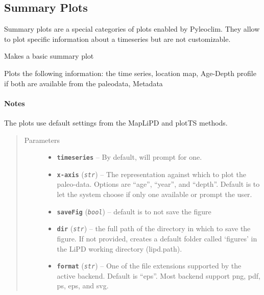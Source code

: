 \documentclass[letterpaper,10pt,english]{sphinxmanual}
\begin{document}
\subsection{Summary Plots}
\label{Main:summary-plots}
Summary plots are a special categories of plots enabled by Pyleoclim.
They allow to plot specific information about a timeseries but are not customizable.

\begin{fulllineitems}
\label{Main:pyleoclim.BasicSummary}
Makes a basic summary plot

Plots the following information: the time series, location map,
Age-Depth profile if both are available from the paleodata, Metadata
\paragraph{Notes}

The plots use default settings from the MapLiPD and plotTS methods.
\begin{quote}\begin{description}
\item[{Parameters}] \leavevmode\begin{itemize}
\item {} 
\textbf{\texttt{timeseries}} -- By default, will prompt for one.

\item {} 
\textbf{\texttt{x-axis}} (\emph{\texttt{str}}) -- The representation against which to plot the paleo-data.
Options are ``age'', ``year'', and ``depth''. Default is to let the
system choose if only one available or prompt the user.

\item {} 
\textbf{\texttt{saveFig}} (\emph{\texttt{bool}}) -- default is to not save the figure

\item {} 
\textbf{\texttt{dir}} (\emph{\texttt{str}}) -- the full path of the directory in which to save the figure.
If not provided, creates a default folder called `figures' in the
LiPD working directory (lipd.path).

\item {} 
\textbf{\texttt{format}} (\emph{\texttt{str}}) -- One of the file extensions supported by the active
backend. Default is ``eps''. Most backend support png, pdf, ps, eps,
and svg.


\end{itemize}
\end{description}
\end{quote}
\end{fulllineitems}
\end{document}
